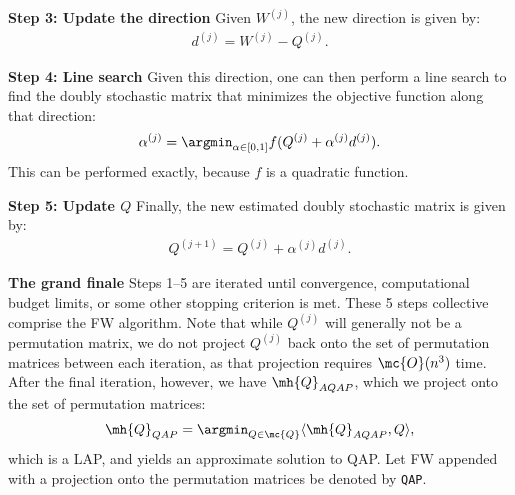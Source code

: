 \documentclass[10pt,journal,cspaper,compsoc]{IEEEtran}
\begin{document}
\textbf{Step 3: Update the direction} Given $W^{(j)}$, the new direction is given by:
\begin{align}
	d^{(j)}=W^{(j)}-Q^{(j)}.
\end{align}


\textbf{Step 4: Line search} Given this direction, one can then perform a line search to find the doubly stochastic matrix that minimizes the objective function along that direction:
\begin{align}
	\alpha^{(j)} = \argmin_{\alpha \in [0,1]} f(Q^{(j)} + \alpha^{(j)} d^{(j)}).
\end{align}
This can be performed exactly, because $f$ is a quadratic function.  


\textbf{Step 5: Update $Q$} Finally, the new estimated doubly stochastic matrix is given by:
\begin{align}\label{eq:update}
	Q^{(j+1)} = Q^{(j)} + \alpha^{(j)} d^{(j)}.
\end{align}


\textbf{The grand finale} Steps 1--5 are iterated until convergence, computational budget limits, or some other stopping criterion is met.  These 5 steps collective comprise the FW algorithm.  Note that while $Q^{(j)}$ will generally not be a permutation matrix, we do not project $Q^{(j)}$ back onto the set of permutation matrices between each iteration, as that projection requires $\mc{O}(n^3)$ time. After the final iteration, however, we have $\mh{Q}_{AQAP}$, which we project onto the set of permutation matrices:
\begin{align} \label{eq:proj}
	\mh{Q}_{QAP} = \argmin_{Q \in \mc{Q}} \langle \mh{Q}_{AQAP}, Q \rangle,
\end{align}
which is a LAP, and yields an approximate solution to QAP.  Let FW appended with a projection onto the permutation matrices be denoted by \texttt{QAP}.

\end{document}

